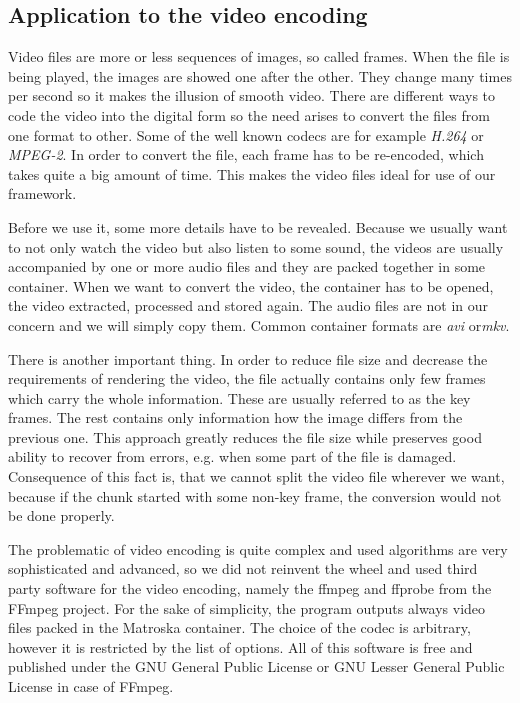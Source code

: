 \subsection*{Application to the video encoding}
Video files are more or less sequences of images, so called frames. When the file is being played, the images are showed one after the other. They change many times per second so it makes the illusion of smooth video. There are different ways to code the video into the digital form so the need arises to convert the files from one format to other. Some of the well known codecs are for example \textit{H.264} or \textit{MPEG-2}. In order to convert the file, each frame has to be re-encoded, which takes quite a big amount of time. This makes the video files ideal for use of our framework.

Before we use it, some more details have to be revealed. Because we usually want to not only watch the video but also listen to some sound, the videos are usually accompanied by one or more audio files and they are packed together in some container. When we want to convert the video, the container has to be opened, the video extracted, processed and stored again. The audio files are not in our concern and we will simply copy them. Common container formats are \textit{avi} or\textit{mkv}.

There is another important thing. In order to reduce file size and decrease the requirements of rendering the video, the file actually contains only few frames which carry the whole information. These are usually referred to as the key frames. The rest contains only information how the image differs from the previous one. This approach greatly reduces the file size while preserves good ability to recover from errors, e.g. when some part of the file is damaged. Consequence of this fact is, that we cannot split the video file wherever we want, because if the chunk started with some non-key frame, the conversion would not be done properly.

The problematic of video encoding is quite complex and used algorithms are very sophisticated and advanced, so we did not reinvent the wheel and used third party software for the video encoding, namely the ffmpeg and ffprobe from the FFmpeg project. For the sake of simplicity, the program outputs always video files packed in the Matroska container. The choice of the codec is arbitrary, however it is restricted by the list of options. All of this software is free and published under the GNU General Public License or GNU Lesser General Public License in case of FFmpeg.


